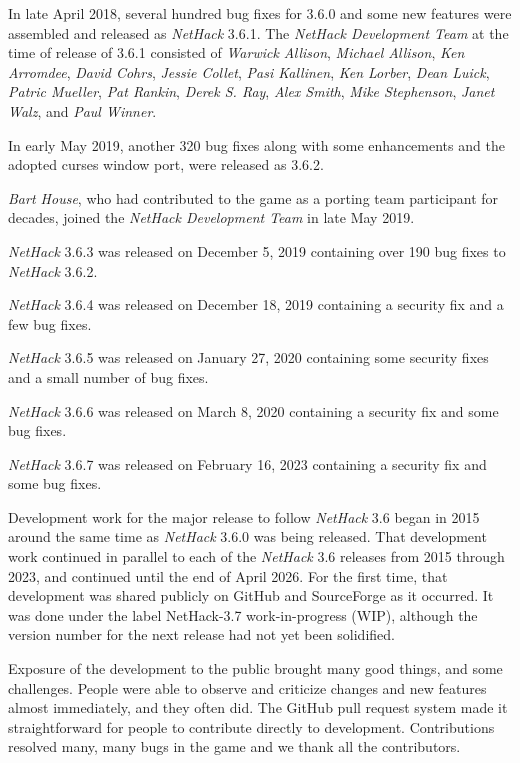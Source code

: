 \documentclass[titlepage]{article}
\begin{document}
\medskip
In late April 2018, several hundred bug fixes for 3.6.0 and some new features
were assembled and released as \textit{NetHack} 3.6.1.
The \textit{NetHack Development Team} at the
time of release of 3.6.1 consisted of
\textit{Warwick Allison}, \textit{Michael Allison}, \textit{Ken Arromdee},
\textit{David Cohrs}, \textit{Jessie Collet},
\textit{Pasi Kallinen}, \textit{Ken Lorber}, \textit{Dean Luick},
\textit{Patric Mueller}, \textit{Pat Rankin}, \textit{Derek S. Ray},
\textit{Alex Smith}, \textit{Mike Stephenson}, \textit{Janet Walz}, and
\textit{Paul Winner}.

\medskip
In early May 2019, another 320 bug fixes along with some enhancements and
the adopted curses window port, were released as 3.6.2.

\medskip
\textit{Bart House}, who had contributed to the game as a porting team participant
for decades, joined the \textit{NetHack Development Team} in late May 2019.

\medskip
\textit{NetHack} 3.6.3 was released on December 5, 2019 containing over 190 bug
fixes to \textit{NetHack} 3.6.2.

\medskip
\textit{NetHack} 3.6.4 was released on December 18, 2019 containing a security fix and
a few bug fixes.

\medskip
\textit{NetHack} 3.6.5 was released on January 27, 2020 containing some security fixes
and a small number of bug fixes.

\medskip
\textit{NetHack} 3.6.6 was released on March 8, 2020 containing a security fix and
some bug fixes.

\medskip
\textit{NetHack} 3.6.7 was released on February 16, 2023 containing a security fix and
some bug fixes.

\medskip
Development work for the major release to follow \textit{NetHack} 3.6 began in 2015
around the same time as \textit{NetHack} 3.6.0 was being released. That development
work continued in parallel to each of the \textit{NetHack} 3.6 releases from 2015
through 2023, and continued until the end of April 2026.  For the first time,
that development was shared publicly on GitHub and SourceForge as it occurred.
It was done under the label NetHack-3.7 work-in-progress (WIP), although the
version number for the next release had not yet been solidified.

\medskip
Exposure of the development to the public brought many good things, and some
challenges. People were able to observe and criticize changes and new features
almost immediately, and they often did. The GitHub pull request system made
it straightforward for people to contribute directly to development.
Contributions resolved many, many bugs in the game and we thank all the
contributors.
\end{document}

